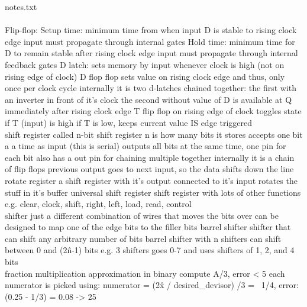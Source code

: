 \documentclass{article}
\begin{document}
\allowdisplaybreaks
\begin{multicols*}{2}
\begin{outline}[compactitem]
\noindent
\0 notes.txt
\noindent \\ 
\noindent \\ 
\0 Flip-flop:
\1     Setup time: minimum time from when input D is stable to rising clock edge
\2         input must propagate through internal gates
\1     Hold time: minimum time for D to remain stable after rising clock edge
\2         input must propagate through internal feedback gates
\0 D latch:
\1     sets memory by input whenever clock is high
\1     (not on rising edge of clock)
\0 D flop flop
\1     sets value on rising clock edge
\2         and thus, only once per clock cycle
\1     internally it is two d-latches chained together:
\2         the first with an inverter in front of it's clock
\2         the second without
\1     value of D is available at Q immediately after rising clock edge
\0 T flip flop
\1     on rising edge of clock toggles state if T (input) is high
\1     if T is low, keeps current value
\1     IS edge triggered
\noindent \\ 
\0 shift register
\1     called n-bit shift register
\2         n is how many bits it stores
\1     accepts one bit a a time as input
\2         (this is serial)
\1     outputs all bits at the same time, one pin for each bit
\1     also has a out pin for chaining multiple together
\1     internally it is a chain of flip flops
\2         previous output goes to next input, so the data shifts down the line
\0 rotate register
\1     a shift register with it's output connected to it's input
\1     rotates the stuff in it's buffer
\0 universal shift register
\1     shift register with lots of other functions
\1     e.g. clear, clock, shift, right, left, load, read, control
\noindent \\ 
\0 shifter
\1     just a different combination of wires that moves the bits over
\1     can be designed to map one of the edge bits to the filler bits
\0 barrel shifter
\1     shifter that can shift any arbitrary number of bits
\1     barrel shifter with n shifters can shift between 0 and (2\^n-1) bits
\1     e.g. 3 shifters goes 0-7
\2         and uses shifters of 1, 2, and 4 bits
\noindent \\ 
\0 fraction multiplication approximation in binary
\1     compute A/3, error < 5%
\2         each numerator is picked using:
\3             numerator = (2\^x / desired\_devisor)
/3 =~ 1/4,   error: (0.25      - 1/3) = 0.08 -> 25   %

\end{outline}
\end{multicols*}
\end{document}
